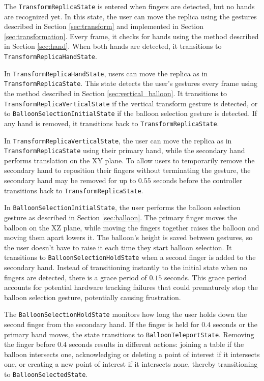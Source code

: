     The \lstinline{TransformReplicaState} is entered when fingers are detected, but no hands are recognized yet. In this state, the user can move the replica using the gestures described in Section \ref{sec:transform} and implemented in Section \ref{sec:transformation}. Every frame, it checks for hands using the method described in Section \ref{sec:hand}. When both hands are detected, it transitions to \lstinline{TransformReplicaHandState}.
    
    In \lstinline{TransformReplicaHandState}, users can move the replica as in \lstinline{TransformReplicaState}. This state detects the user's gestures every frame using the method described in Section \ref{sec:vertical_balloon}. It transitions to \lstinline{TransformReplicaVerticalState} if the vertical transform gesture is detected, or to \lstinline{BalloonSelectionInitialState} if the balloon selection gesture is detected. If any hand is removed, it transitions back to \lstinline{TransformReplicaState}.

    In \lstinline{TransformReplicaVerticalState}, the user can move the replica as in \lstinline{TransformReplicaState} using their primary hand, while the secondary hand performs translation on the XY plane. To allow users to temporarily remove the secondary hand to reposition their fingers without terminating the gesture, the secondary hand may be removed for up to $0.55$ seconds before the controller transitions back to \lstinline{TransformReplicaState}.

    In \lstinline{BalloonSelectionInitialState}, the user performs the balloon selection gesture as described in Section \ref{sec:balloon}. The primary finger moves the balloon on the XZ plane, while moving the fingers together raises the balloon and moving them apart lowers it. The balloon's height is saved between gestures, so the user doesn't have to raise it each time they start balloon selection. It transitions to \lstinline{BalloonSelectionHoldState} when a second finger is added to the secondary hand. Instead of transitioning instantly to the initial state when no fingers are detected, there is a grace period of $0.15$ seconds. This grace period accounts for potential hardware tracking failures that could prematurely stop the balloon selection gesture, potentially causing frustration.

    The \lstinline{BalloonSelectionHoldState} monitors how long the user holds down the second finger from the secondary hand. If the finger is held for $0.4$ seconds or the primary hand moves, the state transitions to \lstinline{BalloonTeleportState}. Removing the finger before $0.4$ seconds results in different actions: joining a table if the balloon intersects one, acknowledging or deleting a point of interest if it intersects one, or creating a new point of interest if it intersects none, thereby transitioning to \lstinline{BalloonSelectedState}.

